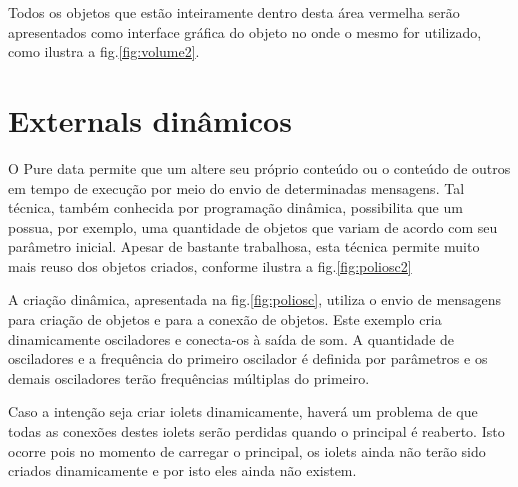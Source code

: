 
Todos os objetos que estão inteiramente dentro desta área vermelha serão
apresentados como interface gráfica do objeto no \patch onde o mesmo for
utilizado, como ilustra a fig.\ref{fig:volume2}.


\section{Externals dinâmicos}

O Pure data permite que um \patch altere seu próprio conteúdo ou o conteúdo de
outros \patches em tempo de execução por meio do envio de determinadas
mensagens. 
Tal técnica, também conhecida por programação dinâmica, possibilita que um
\external possua, por exemplo, uma quantidade de objetos que variam de acordo
com seu parâmetro inicial.
Apesar de bastante trabalhosa, esta técnica permite muito mais reuso dos objetos
criados, conforme ilustra a fig.\ref{fig:poliosc2}


A criação dinâmica, apresentada na fig.\ref{fig:poliosc}, utiliza o envio de
mensagens para criação de objetos e para a conexão de objetos.
Este exemplo cria dinamicamente osciladores e conecta-os à saída de som.
A quantidade de osciladores e a frequência do primeiro oscilador é definida por
parâmetros e os demais osciladores terão frequências múltiplas do primeiro.


Caso a intenção seja criar iolets dinamicamente, haverá um problema de que todas
as conexões destes iolets serão perdidas quando o \patch principal é reaberto.
Isto ocorre pois no momento de carregar o \patch principal, os iolets ainda não
terão sido criados dinamicamente e por isto eles ainda não existem.

